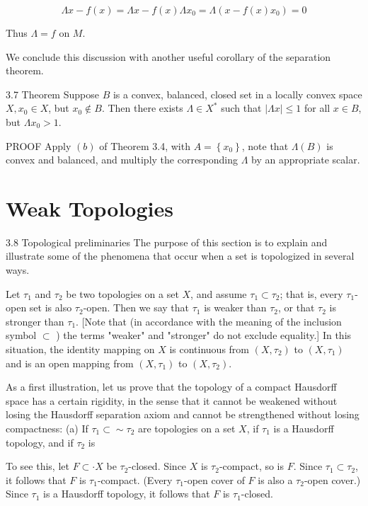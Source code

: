 \documentclass[10pt]{article}
\begin{document}
$$
\Lambda x-f(x)=\Lambda x-f(x) \Lambda x_{0}=\Lambda\left(x-f(x) x_{0}\right)=0
$$

Thus $\Lambda=f$ on $M$.

We conclude this discussion with another useful corollary of the separation theorem.

3.7 Theorem Suppose $B$ is a convex, balanced, closed set in a locally convex space $X, x_{0} \in X$, but $x_{0} \notin B$. Then there exists $\Lambda \in X^{*}$ such that $|\Lambda x| \leq 1$ for all $x \in B$, but $\Lambda x_{0}>1$.

PROOF Apply $(b)$ of Theorem 3.4, with $A=\left\{x_{0}\right\}$, note that $\Lambda(B)$ is convex and balanced, and multiply the corresponding $\Lambda$ by an appropriate scalar.

\section{Weak Topologies}
3.8 Topological preliminaries The purpose of this section is to explain and illustrate some of the phenomena that occur when a set is topologized in several ways.

Let $\tau_{1}$ and $\tau_{2}$ be two topologies on a set $X$, and assume $\tau_{1} \subset \tau_{2}$; that is, every $\tau_{1}$-open set is also $\tau_{2}$-open. Then we say that $\tau_{1}$ is weaker than $\tau_{2}$, or that $\tau_{2}$ is stronger than $\tau_{1}$. [Note that (in accordance with the meaning of the inclusion symbol $\subset$ ) the terms "weaker" and "stronger" do not exclude equality.] In this situation, the identity mapping on $X$ is continuous from $\left(X, \tau_{2}\right)$ to $\left(X, \tau_{1}\right)$ and is an open mapping from $\left(X, \tau_{1}\right)$ to $\left(X, \tau_{2}\right)$.

As a first illustration, let us prove that the topology of a compact Hausdorff space has a certain rigidity, in the sense that it cannot be weakened without losing the Hausdorff separation axiom and cannot be strengthened without losing compactness:
(a) If $\tau_{1} \subset \sim \tau_{2}$ are topologies on a set $X$, if $\tau_{1}$ is a Hausdorff topology, and if $\tau_{2}$ is

To see this, let $F \subset \cdot X$ be $\tau_{2}$-closed. Since $X$ is $\tau_{2}$-compact, so is $F$. Since $\tau_{1} \subset \tau_{2}$, it follows that $F$ is $\tau_{1}$-compact. (Every $\tau_{1}$-open cover of $F$ is also a $\tau_{2}$-open cover.) Since $\tau_{1}$ is a Hausdorff topology, it follows that $F$ is $\tau_{1}$-closed.
\end{document}
